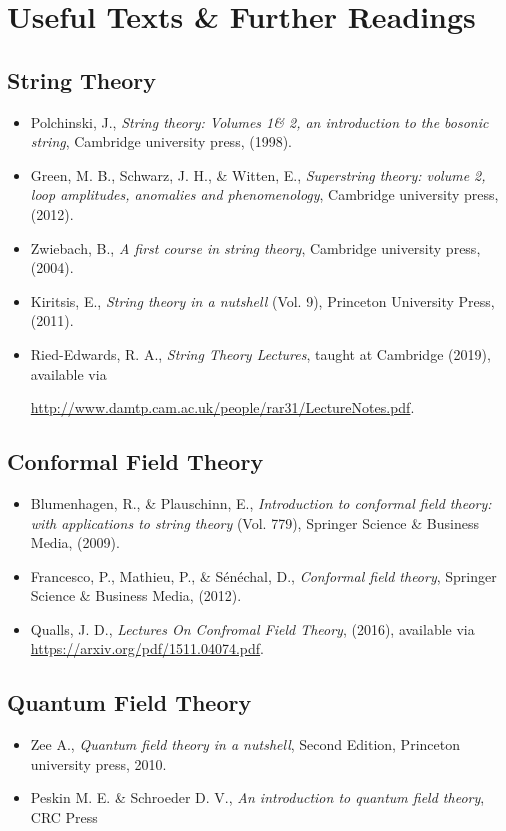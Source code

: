 \chapter*{Useful Texts \& Further Readings}

\section*{String Theory}
\begin{itemize}
    \item Polchinski, J., \textit{String theory: Volumes 1\& 2, an introduction to the bosonic string}, Cambridge university press, (1998).
    \item Green, M. B., Schwarz, J. H., \& Witten, E., \textit{Superstring theory: volume 2, loop amplitudes, anomalies and phenomenology}, Cambridge university press, (2012).
    \item Zwiebach, B., \textit{A first course in string theory}, Cambridge university press, (2004).
    \item Kiritsis, E., \textit{String theory in a nutshell} (Vol. 9), Princeton University Press, (2011).
    \item Ried-Edwards, R. A., \textit{String Theory Lectures}, taught at Cambridge (2019), available via 
    
    \href{http://www.damtp.cam.ac.uk/people/rar31/LectureNotes.pdf}{http://www.damtp.cam.ac.uk/people/rar31/LectureNotes.pdf}.
\end{itemize}

\section*{Conformal Field Theory}
\begin{itemize}
    \item Blumenhagen, R., \& Plauschinn, E., \textit{Introduction to conformal field theory: with applications to string theory} (Vol. 779), Springer Science \& Business Media, (2009).
    \item Francesco, P., Mathieu, P., \& Sénéchal, D., \textit{Conformal field theory}, Springer Science \& Business Media, (2012).
    \item Qualls, J. D., \textit{Lectures On Confromal Field Theory}, (2016), available via \\
    \href{https://arxiv.org/pdf/1511.04074.pdf}{https://arxiv.org/pdf/1511.04074.pdf}.
\end{itemize}

\section*{Quantum Field Theory}
\begin{itemize}
    \item  Zee A., \textit{Quantum field theory in a nutshell}, Second Edition, Princeton university press, 2010.
    \item Peskin M. E. \& Schroeder D. V., \textit{An introduction to quantum field theory}, CRC Press
\end{itemize}

